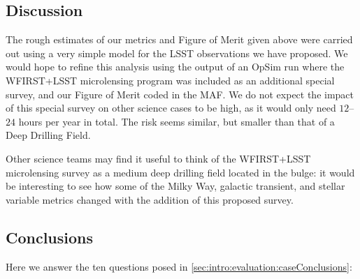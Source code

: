 %
%
%
%

\subsection{Discussion}
\label{sec:\secname:discussion}

The rough estimates of our metrics and Figure of Merit given above were
carried out using a very simple model for the LSST observations we
have proposed. We would hope to refine this analysis using the output
of an OpSim run where the WFIRST+LSST microlensing program was included
as an additional special survey, and our Figure of Merit coded in the
MAF. We do not expect the impact of this special survey on other science cases
to be high, as it would only need $12$--$24$ hours per year in total. The risk
seems similar, but smaller than that of a Deep Drilling Field.

Other science teams may find it useful to think of the WFIRST+LSST microlensing
survey as a medium deep drilling field located in the bulge: it would be interesting
to see how some of the Milky Way, galactic transient, and  stellar variable
metrics changed with the addition of this proposed survey.



\subsection{Conclusions}

Here we answer the ten questions posed in
\autoref{sec:intro:evaluation:caseConclusions}:


